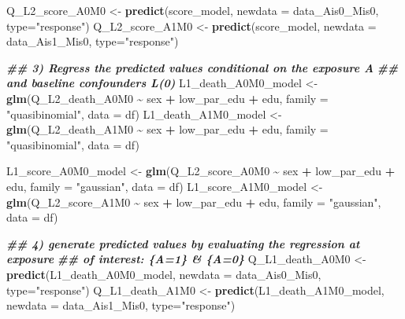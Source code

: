 \documentclass[
]{book}
\newenvironment{Shaded}{\begin{snugshade}}{\end{snugshade}}
\newcommand{\AttributeTok}[1]{\textcolor[rgb]{0.13,0.29,0.53}{#1}}
\newcommand{\DocumentationTok}[1]{\textcolor[rgb]{0.56,0.35,0.01}{\textbf{\textit{#1}}}}
\newcommand{\FunctionTok}[1]{\textcolor[rgb]{0.13,0.29,0.53}{\textbf{#1}}}
\newcommand{\NormalTok}[1]{#1}
\newcommand{\OtherTok}[1]{\textcolor[rgb]{0.56,0.35,0.01}{#1}}
\newcommand{\SpecialCharTok}[1]{\textcolor[rgb]{0.81,0.36,0.00}{\textbf{#1}}}
\newcommand{\StringTok}[1]{\textcolor[rgb]{0.31,0.60,0.02}{#1}}
\begin{document}
\begin{Shaded}
\begin{Highlighting}[]
\NormalTok{Q\_L2\_score\_A0M0 }\OtherTok{\textless{}{-}} \FunctionTok{predict}\NormalTok{(score\_model, }
                           \AttributeTok{newdata =}\NormalTok{ data\_Ais0\_Mis0, }\AttributeTok{type=}\StringTok{"response"}\NormalTok{)}
\NormalTok{Q\_L2\_score\_A1M0 }\OtherTok{\textless{}{-}} \FunctionTok{predict}\NormalTok{(score\_model, }
                           \AttributeTok{newdata =}\NormalTok{ data\_Ais1\_Mis0, }\AttributeTok{type=}\StringTok{"response"}\NormalTok{)}

\DocumentationTok{\#\# 3) Regress the predicted values conditional on the exposure A}
\DocumentationTok{\#\#    and baseline confounders L(0)}
\NormalTok{L1\_death\_A0M0\_model }\OtherTok{\textless{}{-}} \FunctionTok{glm}\NormalTok{(Q\_L2\_death\_A0M0 }\SpecialCharTok{\textasciitilde{}}\NormalTok{ sex }\SpecialCharTok{+}\NormalTok{ low\_par\_edu }\SpecialCharTok{+}\NormalTok{ edu,}
                           \AttributeTok{family =} \StringTok{"quasibinomial"}\NormalTok{, }\AttributeTok{data =}\NormalTok{ df)}
\NormalTok{L1\_death\_A1M0\_model }\OtherTok{\textless{}{-}} \FunctionTok{glm}\NormalTok{(Q\_L2\_death\_A1M0 }\SpecialCharTok{\textasciitilde{}}\NormalTok{ sex }\SpecialCharTok{+}\NormalTok{ low\_par\_edu }\SpecialCharTok{+}\NormalTok{ edu,}
                           \AttributeTok{family =} \StringTok{"quasibinomial"}\NormalTok{, }\AttributeTok{data =}\NormalTok{ df)}

\NormalTok{L1\_score\_A0M0\_model }\OtherTok{\textless{}{-}} \FunctionTok{glm}\NormalTok{(Q\_L2\_score\_A0M0 }\SpecialCharTok{\textasciitilde{}}\NormalTok{ sex }\SpecialCharTok{+}\NormalTok{ low\_par\_edu }\SpecialCharTok{+}\NormalTok{ edu,}
                           \AttributeTok{family =} \StringTok{"gaussian"}\NormalTok{, }\AttributeTok{data =}\NormalTok{ df)}
\NormalTok{L1\_score\_A1M0\_model }\OtherTok{\textless{}{-}} \FunctionTok{glm}\NormalTok{(Q\_L2\_score\_A1M0 }\SpecialCharTok{\textasciitilde{}}\NormalTok{ sex }\SpecialCharTok{+}\NormalTok{ low\_par\_edu }\SpecialCharTok{+}\NormalTok{ edu,}
                           \AttributeTok{family =} \StringTok{"gaussian"}\NormalTok{, }\AttributeTok{data =}\NormalTok{ df)}

\DocumentationTok{\#\# 4) generate predicted values by evaluating the regression at exposure }
\DocumentationTok{\#\#    of interest: \{A=1\} \& \{A=0\}}
\NormalTok{Q\_L1\_death\_A0M0 }\OtherTok{\textless{}{-}} \FunctionTok{predict}\NormalTok{(L1\_death\_A0M0\_model, }
                           \AttributeTok{newdata =}\NormalTok{ data\_Ais0\_Mis0, }\AttributeTok{type=}\StringTok{"response"}\NormalTok{)}
\NormalTok{Q\_L1\_death\_A1M0 }\OtherTok{\textless{}{-}} \FunctionTok{predict}\NormalTok{(L1\_death\_A1M0\_model, }
                           \AttributeTok{newdata =}\NormalTok{ data\_Ais1\_Mis0, }\AttributeTok{type=}\StringTok{"response"}\NormalTok{)}


\end{Highlighting}
\end{Shaded}
\end{document}
